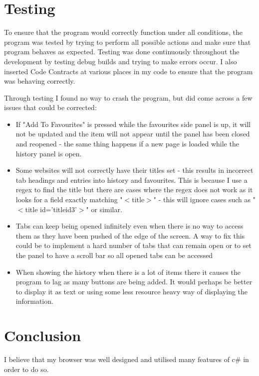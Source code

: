 \documentclass[11pt]{report}
\begin{document}
\chapter{Testing}

To ensure that the program would correctly function under all conditions, the program was tested by trying to perform all possible actions and make sure that program behaves as expected.  Testing was done continuously throughout the development by testing debug builds and trying to make errors occur.  I also inserted Code Contracts at various places in my code to ensure that the program was behaving correctly.

Through testing I found no way to crash the program, but did come across a few issues that could be corrected:\\
\begin{itemize}
\item If "Add To Favourites" is pressed while the favourites side panel is up, it will not be updated and the item will not appear until the panel has been closed and reopened - the same thing happens if a new page is loaded while the history panel is open.
\item Some websites will not correctly have their titles set - this results in incorrect tab headings and entries into history and favourites.  This is because I use a regex to find the title but there are cases where the regex does not work as it looks for a field exactly matching "$<$title$>$" - this will ignore cases such as "$<$title id='titleid3'$>$" or similar.
\item Tabs can keep being opened infinitely even when there is no way to access them as they have been pushed of the edge of the screen.  A way to fix this could be to implement a hard number of tabs that can remain open or to set the panel to have a scroll bar so all opened tabs can be accessed
\item When showing the history when there is a lot of items there it causes the program to lag as many buttons are being added.  It would perhaps be better to display it as text or using some less resource heavy way of displaying the information.
\end{itemize}

\chapter{Conclusion}

I believe that my browser was well designed and utilised many features of c\# in order to do so.
\end{document}
